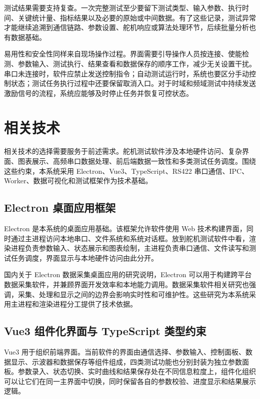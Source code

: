 测试结果需要支持复查。一次完整测试至少要留下测试类型、输入参数、执行时间、关键统计量、指标结果以及必要的原始或中间数据。有了这些记录，测试异常才能继续追溯到通信链路、参数设置、舵机响应或算法处理环节，后续批量分析也有数据基础。

易用性和安全性同样来自现场操作过程。界面需要引导操作人员按连接、使能检测、参数输入、测试执行、结果查看和数据保存的顺序工作，减少无关设置干扰。串口未连接时，软件应禁止发送控制指令；自动测试运行时，系统也要区分手动控制状态；测试任务执行过程中还要保留取消入口。对于时域和频域测试中持续发送激励信号的流程，系统应能够及时停止任务并恢复可控状态。

\section{相关技术}

相关技术的选择需要服务于前述需求。舵机测试软件涉及本地硬件访问、复杂界面、图表展示、高频串口数据处理、前后端数据一致性和多类测试任务调度。围绕这些约束，本系统采用 Electron、Vue3、TypeScript、RS422 串口通信、IPC、Worker、数据可视化和测试框架作为技术基础。

\subsection{Electron 桌面应用框架}

Electron 是本系统的桌面应用基础。该框架允许软件使用 Web 技术构建界面，同时通过主进程访问本地串口、文件系统和系统对话框。放到舵机测试软件中看，渲染进程负责参数输入、状态展示和图表绘制，主进程负责串口通信、文件读写和测试任务调度，界面显示与本地硬件访问由此分开。

国内关于 Electron 数据采集桌面应用的研究说明，Electron 可以用于构建跨平台数据采集软件，并兼顾界面开发效率和本地能力调用\cite{gao2025electron}。数据采集软件相关研究也强调，采集、处理和显示之间的边界会影响实时性和可维护性\cite{stansbury2023autodidaqt,turkmanovic2023highspeed}。这些研究为本系统采用主进程和渲染进程分工提供了技术依据。

\subsection{Vue3 组件化界面与 TypeScript 类型约束}

Vue3 用于组织前端界面。当前软件的界面由通信选择、参数输入、控制面板、数据显示、示波器和数据保存等组件组成，四类测试功能也分别封装为独立参数面板。参数录入、状态切换、实时曲线和结果保存处在不同信息粒度上，组件化组织可以让它们在同一主界面中切换，同时保留各自的参数校验、进度显示和结果展示逻辑。

